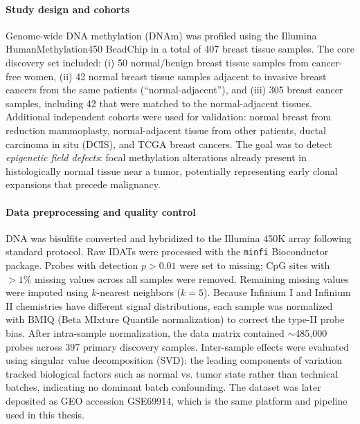 \documentclass[10pt]{extarticle}
\begin{document}
\paragraph{Study design and cohorts}
Genome-wide DNA methylation (DNAm) was profiled using the Illumina HumanMethylation450 BeadChip in a total of 407 breast tissue samples. The core discovery set included: (i) 50 normal/benign breast tissue samples from cancer-free women, (ii) 42 normal breast tissue samples adjacent to invasive breast cancers from the same patients (``normal-adjacent''), and (iii) 305 breast cancer samples, including 42 that were matched to the normal-adjacent tissues. Additional independent cohorts were used for validation: normal breast from reduction mammoplasty, normal-adjacent tissue from other patients, ductal carcinoma in situ (DCIS), and TCGA breast cancers. The goal was to detect \textit{epigenetic field defects}: focal methylation alterations already present in histologically normal tissue near a tumor, potentially representing early clonal expansions that precede malignancy.

\paragraph{Data preprocessing and quality control}
DNA was bisulfite converted and hybridized to the Illumina 450K array following standard protocol. Raw IDATs were processed with the \texttt{minfi} Bioconductor package. Probes with detection $p > 0.01$ were set to missing; CpG sites with $>1\%$ missing values across all samples were removed. Remaining missing values were imputed using $k$-nearest neighbors ($k=5$). Because Infinium I and Infinium II chemistries have different signal distributions, each sample was normalized with BMIQ (Beta MIxture Quantile normalization) to correct the type-II probe bias. After intra-sample normalization, the data matrix contained $\sim$485{,}000 probes across 397 primary discovery samples. Inter-sample effects were evaluated using singular value decomposition (SVD): the leading components of variation tracked biological factors such as normal vs. tumor state rather than technical batches, indicating no dominant batch confounding. The dataset was later deposited as GEO accession GSE69914, which is the same platform and pipeline used in this thesis.
\end{document}
